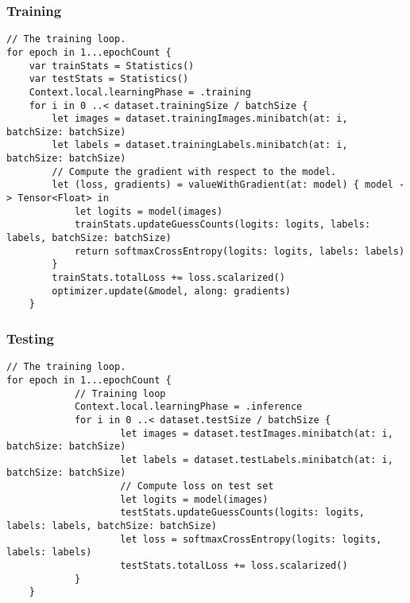 \begin{frame}[fragile] \frametitle{Training}

\begin{lstlisting}[basicstyle=\scriptsize]
// The training loop.
for epoch in 1...epochCount {
    var trainStats = Statistics()
    var testStats = Statistics()
    Context.local.learningPhase = .training
    for i in 0 ..< dataset.trainingSize / batchSize {
        let images = dataset.trainingImages.minibatch(at: i, batchSize: batchSize)
        let labels = dataset.trainingLabels.minibatch(at: i, batchSize: batchSize)
        // Compute the gradient with respect to the model.
        let (loss, gradients) = valueWithGradient(at: model) { model -> Tensor<Float> in
            let logits = model(images)
            trainStats.updateGuessCounts(logits: logits, labels: labels, batchSize: batchSize)
            return softmaxCrossEntropy(logits: logits, labels: labels)
        }
        trainStats.totalLoss += loss.scalarized()
        optimizer.update(&model, along: gradients)
    }
\end{lstlisting}

\end{frame}

\begin{frame}[fragile] \frametitle{Testing}

\begin{lstlisting}[basicstyle=\scriptsize]
// The training loop.
for epoch in 1...epochCount {
			// Training loop
			Context.local.learningPhase = .inference
			for i in 0 ..< dataset.testSize / batchSize {
					let images = dataset.testImages.minibatch(at: i, batchSize: batchSize)
					let labels = dataset.testLabels.minibatch(at: i, batchSize: batchSize)
					// Compute loss on test set
					let logits = model(images)
					testStats.updateGuessCounts(logits: logits, labels: labels, batchSize: batchSize)
					let loss = softmaxCrossEntropy(logits: logits, labels: labels)
					testStats.totalLoss += loss.scalarized()
			}			
    }
\end{lstlisting}

\end{frame}

